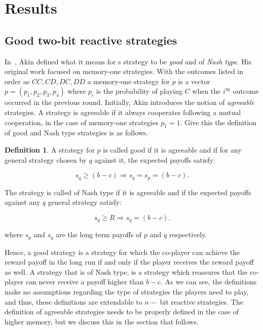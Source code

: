 \documentclass{article}
\theoremstyle{definition}
\newtheorem{definition}{Definition}[section]
\begin{document}
\section{Results}

\subsection{Good two-bit reactive strategies}\label{section:good_strategies}

In~\cite{akin:EGADS:2016}, Akin defined what it means for s strategy to be
\textit{good} and of \textit{Nash type}. His original work focused on memory-one
strategies. With the outcomes listed in order as \(CC, CD, DC, DD\) a memory-one
strategy for \(p\) is a vector \(p = (p_1, p_2, p_3, p_4)\) where \(p_i\) is the
probability of playing \(C\) when the \(i^{\text{th}}\) outcome occurred in the
previous round. Initially, Akin introduces the notion of \textit{agreeable}
strategies. A strategy is agreeable if it always cooperates following a
mutual cooperation, in the case of memory-one strategies \(p_1=1\). Give this
the definition of good and Nash type strategies is as follows.

\begin{definition}
  A strategy for \(p\) is called good if it is agreeable and if for any general
  strategy chosen by \(q\) against it, the expected payoffs satisfy:
  
  \begin{equation}
    s_{q} \geq (b - c) \Rightarrow s_{q} = s_{p} =  (b - c).
  \end{equation}

  The strategy is called of Nash type if it is agreeable and if the expected
  payoffs against any \(q\) general strategy satisfy:

  \begin{equation}
    s_{q} \geq R \Rightarrow s_{q} =  (b - c).
  \end{equation}

  where \(s_{p}\) and \(s_{q}\) are the long term payoffs of \(p\) and \(q\)
  respectively.
\end{definition}

Hence, a good strategy is a strategy for which the co-player can achieve the
reward payoff in the long run if and only if the player receives the reward
payoff as well. A strategy that is of Nash type, is a strategy which reassures
that the co-player can never receive a payoff higher than \(b - c\). As we can
see, the definitions make no assumptions regarding the type of strategies the
players need to play, and thus, these definitions are extendable to \(n-\) bit
reactive strategies. The definition of agreeable strategies needs to be properly
defined in the case of higher memory, but we discuss this in the section that
follows.
\end{document}
